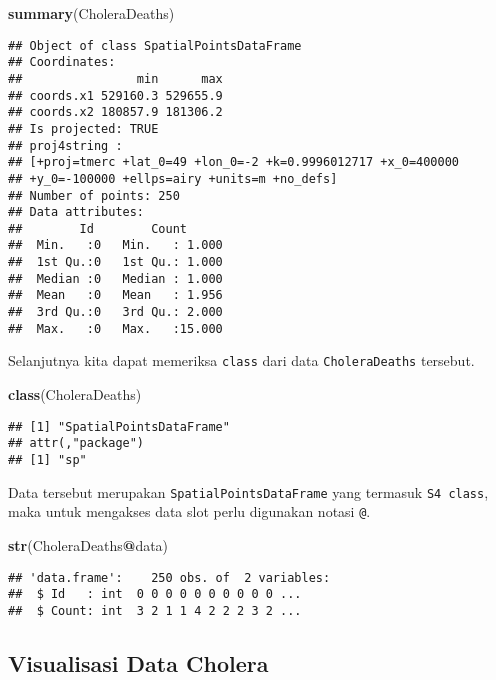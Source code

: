 \documentclass[
]{book}
\newenvironment{Shaded}{\begin{snugshade}}{\end{snugshade}}
\newcommand{\KeywordTok}[1]{\textcolor[rgb]{0.13,0.29,0.53}{\textbf{#1}}}
\newcommand{\NormalTok}[1]{#1}
\newcommand{\OperatorTok}[1]{\textcolor[rgb]{0.81,0.36,0.00}{\textbf{#1}}}
\begin{document}
\begin{Shaded}
\begin{Highlighting}[]
\KeywordTok{summary}\NormalTok{(CholeraDeaths)}
\end{Highlighting}
\end{Shaded}

\begin{verbatim}
## Object of class SpatialPointsDataFrame
## Coordinates:
##                min      max
## coords.x1 529160.3 529655.9
## coords.x2 180857.9 181306.2
## Is projected: TRUE 
## proj4string :
## [+proj=tmerc +lat_0=49 +lon_0=-2 +k=0.9996012717 +x_0=400000
## +y_0=-100000 +ellps=airy +units=m +no_defs]
## Number of points: 250
## Data attributes:
##        Id        Count       
##  Min.   :0   Min.   : 1.000  
##  1st Qu.:0   1st Qu.: 1.000  
##  Median :0   Median : 1.000  
##  Mean   :0   Mean   : 1.956  
##  3rd Qu.:0   3rd Qu.: 2.000  
##  Max.   :0   Max.   :15.000
\end{verbatim}

Selanjutnya kita dapat memeriksa \texttt{class} dari data \texttt{CholeraDeaths} tersebut.

\begin{Shaded}
\begin{Highlighting}[]
\KeywordTok{class}\NormalTok{(CholeraDeaths)}
\end{Highlighting}
\end{Shaded}

\begin{verbatim}
## [1] "SpatialPointsDataFrame"
## attr(,"package")
## [1] "sp"
\end{verbatim}

Data tersebut merupakan \texttt{SpatialPointsDataFrame} yang termasuk \texttt{S4\ class}, maka untuk mengakses data slot perlu digunakan notasi \texttt{@}.

\begin{Shaded}
\begin{Highlighting}[]
\KeywordTok{str}\NormalTok{(CholeraDeaths}\OperatorTok{@}\NormalTok{data)}
\end{Highlighting}
\end{Shaded}

\begin{verbatim}
## 'data.frame':    250 obs. of  2 variables:
##  $ Id   : int  0 0 0 0 0 0 0 0 0 0 ...
##  $ Count: int  3 2 1 1 4 2 2 2 3 2 ...
\end{verbatim}

\hypertarget{visualisasi-data-cholera}{%
\subsection{Visualisasi Data Cholera}\label{visualisasi-data-cholera}}
\end{document}
